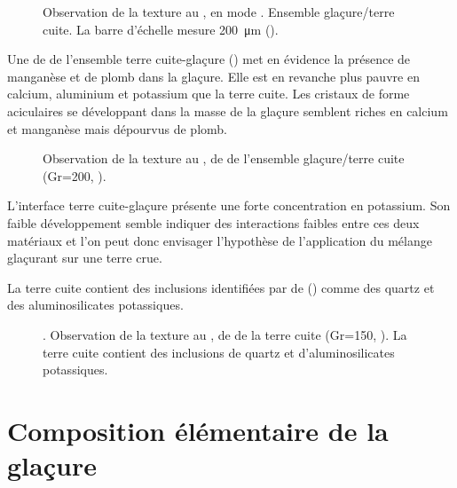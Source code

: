 \begin{figure}[htb]
  \caption[\ -- Observation de la texture au \MEB, 
           en mode \ERD. Ensemble glaçure/terre cuite]
          {\legendeC
           Observation de la texture au \MEB, en mode \ERD. 
           Ensemble glaçure/terre cuite. La barre d'échelle mesure 
           \SI{200}{\um} ().}
  \label{MEB:6530_img}
\end{figure}

Une \carto de \RX de l'ensemble terre cuite-glaçure 
() met en évidence la présence de 
manganèse et de plomb dans la glaçure. Elle est en revanche plus 
pauvre en calcium, aluminium et potassium que la terre cuite. Les 
cristaux de forme aciculaires se développant dans la masse de la 
glaçure semblent riches en calcium et manganèse mais dépourvus de 
plomb.

\begin{figure}[htb]
  \caption[\ -- Observation de la texture au \MEB, \carto de \RX de l'ensemble glaçure/terre cuite]
          {\legendeC
           Observation de la texture au \MEB, \carto de \RX de l'ensemble glaçure/terre cuite (Gr=200, ).}
  \label{MEB:6530_carto_tcgla}
\end{figure}

L'interface terre cuite-glaçure présente une forte concentration en 
potassium. Son faible développement semble indiquer des interactions 
faibles entre ces deux matériaux et l'on peut donc envisager 
l'hypothèse de l'application du mélange glaçurant sur une terre crue.

La terre cuite contient des inclusions identifiées par \carto de \RX 
() comme des quartz et des aluminosilicates 
potassiques.

\begin{figure}[htb]
  \caption[\ -- Observation de la texture au \MEB, 
           \carto de \RX de la terre cuite]
          {\legendeC.
           Observation de la texture au \MEB, 
           \carto de \RX de la terre cuite 
           (Gr=150, ). La terre cuite contient des 
           inclusions de quartz et d'aluminosilicates potassiques.}
  \label{MEB:6530_carto_tc}
\end{figure}


\section{Composition élémentaire de la glaçure}

